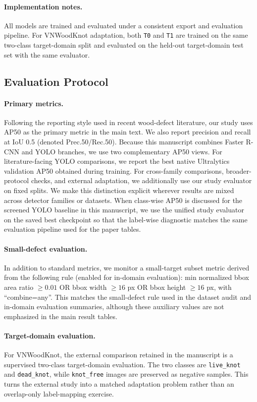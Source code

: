 \paragraph{Implementation notes.}
All models are trained and evaluated under a consistent export and evaluation pipeline. For VNWoodKnot adaptation, both \texttt{T0} and \texttt{T1} are trained on the same two-class target-domain split and evaluated on the held-out target-domain test set with the same evaluator.

\subsection{Evaluation Protocol}
\label{sec:eval}

\paragraph{Primary metrics.}
Following the reporting style used in recent wood-defect literature, our study uses AP50 as the primary metric in the main text. We also report precision and recall at IoU 0.5 (denoted Prec.50/Rec.50). Because this manuscript combines Faster R-CNN and YOLO branches, we use two complementary AP50 views. For literature-facing YOLO comparisons, we report the best native Ultralytics validation AP50 obtained during training. For cross-family comparisons, broader-protocol checks, and external adaptation, we additionally use our study evaluator on fixed splits. We make this distinction explicit wherever results are mixed across detector families or datasets.
When class-wise AP50 is discussed for the screened YOLO baseline in this manuscript, we use the unified study evaluator on the saved best checkpoint so that the label-wise diagnostic matches the same evaluation pipeline used for the paper tables.

\paragraph{Small-defect evaluation.}
In addition to standard metrics, we monitor a small-target subset metric derived from the following rule (enabled for in-domain evaluation):
min normalized bbox area ratio $\ge 0.01$ OR bbox width $\ge 16$ px OR bbox height $\ge 16$ px, with ``combine=any''.
This matches the small-defect rule used in the dataset audit and in-domain evaluation summaries, although these auxiliary values are not emphasized in the main result tables.

\paragraph{Target-domain evaluation.}
For VNWoodKnot, the external comparison retained in the manuscript is a supervised two-class target-domain evaluation. The two classes are \texttt{live\_knot} and \texttt{dead\_knot}, while \texttt{knot\_free} images are preserved as negative samples. This turns the external study into a matched adaptation problem rather than an overlap-only label-mapping exercise.

